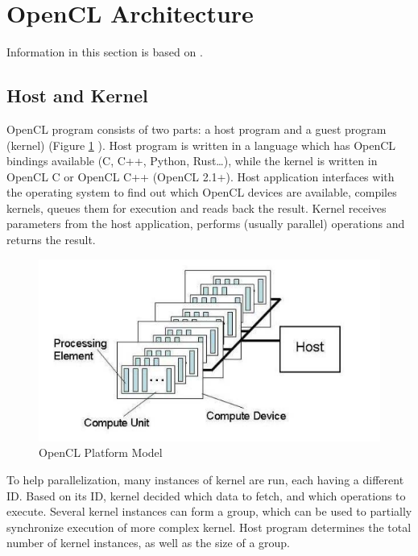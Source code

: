 
\section{OpenCL Architecture}

Information in this section is based on \cite{gaster2012heterogeneous}.

\subsection{Host and Kernel}

OpenCL program consists of two parts: a host program and a guest program (kernel) (Figure \ref{fig:openclplatform} \cite{munshi2009opencl}). Host program is written in a language which has OpenCL bindings available (C, C++, Python, Rust\dots), while the kernel is written in OpenCL C or OpenCL C++ (OpenCL 2.1+). Host application interfaces with the operating system to find out which OpenCL devices are available, compiles kernels, queues them for execution and reads back the result. Kernel receives parameters from the host application, performs (usually parallel) operations and returns the result.

\begin{figure}[h]
    \includegraphics[width=\linewidth]{Figures/platform.png}
    \caption{OpenCL Platform Model}
    \label{fig:openclplatform}
\end{figure}

\noindent To help parallelization, many instances of kernel are run, each having a different ID. Based on its ID, kernel decided which data to fetch, and which operations to execute. Several kernel instances can form a group, which can be used to partially synchronize execution of more complex kernel. Host program determines the total number of kernel instances, as well as the size of a group.

